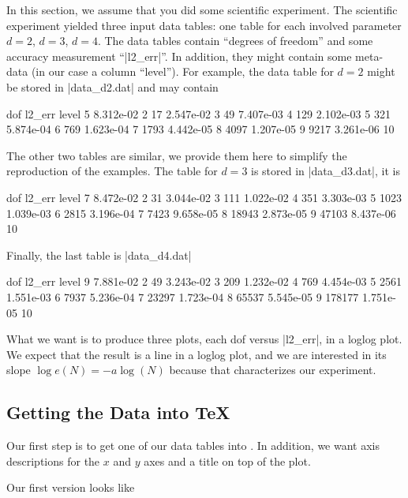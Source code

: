 In this section, we assume that you did some scientific experiment. The scientific experiment yielded three input data tables: one table for each involved parameter $d=2$, $d=3$, $d=4$. The data tables contain ``degrees of freedom'' and some accuracy measurement ``|l2_err|''. In addition, they might contain some meta-data (in our case a column ``level''). For example, the data table for $d=2$ might be stored in |data_d2.dat| and may contain
\begin{codeexample}
dof        l2_err     level
5          8.312e-02  2
17         2.547e-02  3
49         7.407e-03  4
129        2.102e-03  5
321        5.874e-04  6
769        1.623e-04  7
1793       4.442e-05  8
4097       1.207e-05  9
9217       3.261e-06  10
\end{codeexample}
The other two tables are similar, we provide them here to simplify the reproduction of the examples. The table for $d=3$ is stored in |data_d3.dat|, it is
\begin{codeexample}
dof        l2_err     level
7          8.472e-02  2
31         3.044e-02  3
111        1.022e-02  4
351        3.303e-03  5
1023       1.039e-03  6
2815       3.196e-04  7
7423       9.658e-05  8
18943      2.873e-05  9
47103      8.437e-06  10
\end{codeexample}
Finally, the last table is |data_d4.dat|
\begin{codeexample}
dof        l2_err     level
9          7.881e-02  2
49         3.243e-02  3
209        1.232e-02  4
769        4.454e-03  5
2561       1.551e-03  6
7937       5.236e-04  7
23297      1.723e-04  8
65537      5.545e-05  9
178177     1.751e-05  10
\end{codeexample}

What we want is to produce three plots, each dof versus |l2_err|, in a loglog plot. We expect that the result is a line in a loglog plot, and we are interested in its slope $\log e(N) = -a \log(N)$ because that characterizes our experiment.

\subsection{Getting the Data into TeX}
\label{sec:tut2:step1}

Our first step is to get one of our data tables into \PGFPlots. In addition, we want axis descriptions for the $x$ and $y$ axes and a title on top of the plot.

Our first version looks like
\begin{codeexample}[]

%


%
\end{codeexample}

